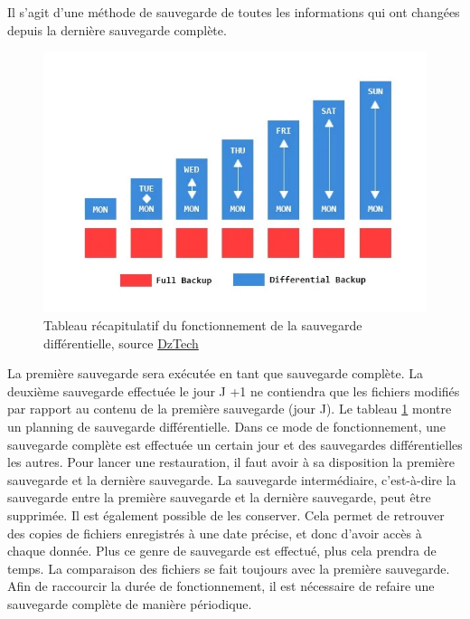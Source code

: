 \documentclass[pfe]{tnreport} %
\begin{document}
Il s'agit d'une méthode de sauvegarde de toutes les informations qui ont changées depuis la dernière sauvegarde complète. \newline
\begin{figure}[!h]
 \centering
 \includegraphics[width=15cm]{figures/differentiel.png}
 \caption{Tableau récapitulatif du fonctionnement de la sauvegarde différentielle, source
 \href{https://www.dz-techs.com/fr/compare-the-different-backup-types}{DzTech}}
 \label{fig:differentielle}
\end{figure}

La première sauvegarde sera exécutée en tant que sauvegarde complète. La deuxième sauvegarde effectuée le jour J +1 ne contiendra que les fichiers modifiés par rapport au contenu de la première sauvegarde (jour J).\newline
Le tableau \ref{fig:differentielle} montre un planning de sauvegarde différentielle. \newline
Dans ce mode de fonctionnement, une sauvegarde complète est effectuée un certain jour et des sauvegardes différentielles les autres. \newline
Pour lancer une restauration, il faut avoir à sa disposition la première sauvegarde et la dernière sauvegarde. La sauvegarde intermédiaire, c'est-à-dire la sauvegarde entre la première sauvegarde et la dernière sauvegarde, peut être supprimée. \newline
Il est également possible de les conserver. Cela permet de retrouver des copies de fichiers enregistrés à une date précise, et donc d'avoir accès à chaque donnée. \newline
Plus ce genre de sauvegarde est effectué, plus cela prendra de temps. La comparaison des fichiers se fait toujours avec la première sauvegarde. \newline
Afin de raccourcir la durée de fonctionnement, il est nécessaire de refaire une sauvegarde complète de manière périodique.
\end{document}

